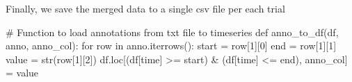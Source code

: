 \documentclass[
  letterpaper,
  DIV=11,
  numbers=noendperiod]{scrreprt}
\newenvironment{Shaded}{\begin{snugshade}}{\end{snugshade}}
\newcommand{\BuiltInTok}[1]{\textcolor[rgb]{0.00,0.23,0.31}{#1}}
\newcommand{\CommentTok}[1]{\textcolor[rgb]{0.37,0.37,0.37}{#1}}
\newcommand{\ControlFlowTok}[1]{\textcolor[rgb]{0.00,0.23,0.31}{#1}}
\newcommand{\DecValTok}[1]{\textcolor[rgb]{0.68,0.00,0.00}{#1}}
\newcommand{\KeywordTok}[1]{\textcolor[rgb]{0.00,0.23,0.31}{#1}}
\newcommand{\NormalTok}[1]{\textcolor[rgb]{0.00,0.23,0.31}{#1}}
\newcommand{\OperatorTok}[1]{\textcolor[rgb]{0.37,0.37,0.37}{#1}}
\newcommand{\StringTok}[1]{\textcolor[rgb]{0.13,0.47,0.30}{#1}}
\begin{document}
Finally, we save the merged data to a single csv file per each trial

\begin{Shaded}
\begin{Highlighting}[]
\CommentTok{\# Function to load annotations from txt file to timeseries}
\KeywordTok{def}\NormalTok{ anno\_to\_df(df, anno, anno\_col):}
    \ControlFlowTok{for}\NormalTok{ row }\KeywordTok{in}\NormalTok{ anno.iterrows():}
\NormalTok{        start }\OperatorTok{=}\NormalTok{ row[}\DecValTok{1}\NormalTok{][}\DecValTok{0}\NormalTok{]}
\NormalTok{        end }\OperatorTok{=}\NormalTok{ row[}\DecValTok{1}\NormalTok{][}\DecValTok{1}\NormalTok{]}
\NormalTok{        value }\OperatorTok{=} \BuiltInTok{str}\NormalTok{(row[}\DecValTok{1}\NormalTok{][}\DecValTok{2}\NormalTok{])}
\NormalTok{        df.loc[(df[}\StringTok{\textquotesingle{}time\textquotesingle{}}\NormalTok{] }\OperatorTok{\textgreater{}=}\NormalTok{ start) }\OperatorTok{\&}\NormalTok{ (df[}\StringTok{\textquotesingle{}time\textquotesingle{}}\NormalTok{] }\OperatorTok{\textless{}=}\NormalTok{ end), anno\_col] }\OperatorTok{=}\NormalTok{ value}
\end{Highlighting}
\end{Shaded}
\end{document}
